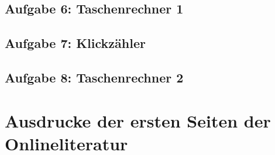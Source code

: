 \begin{appendices}



\subsection{Aufgabe 6: Taschenrechner 1}
\label{app:code6}




\subsection{Aufgabe 7: Klickzähler}
\label{app:code7}




\subsection{Aufgabe 8: Taschenrechner 2}
\label{app:code8}




\section{Ausdrucke der ersten Seiten der Onlineliteratur}
\pagebreak


\pagebreak


\pagebreak


\end{appendices}